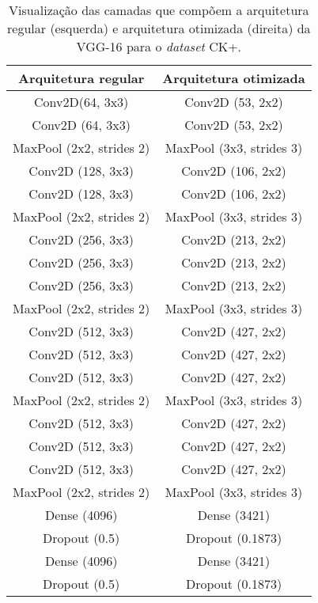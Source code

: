 \documentclass[
12pt,       %
openright,      %
oneside,      %
a4paper,      %
english,      %
french,       %
spanish,      %
brazil        %
]{abntex2}
\begin{document}
\begin{table}[H]
\centering
\caption{Visualização das camadas que compõem a arquitetura regular (esquerda) e arquitetura otimizada (direita) da VGG-16 para o \textit{dataset} CK+.}
\label{tab:comparacao-vgg16-ck+}
\begin{tabular}{@{}cc@{}}
\toprule
\textbf{Arquitetura regular} & \textbf{Arquitetura otimizada} \\ \midrule
Conv2D(64, 3x3)              & Conv2D (53, 2x2)                \\
Conv2D (64, 3x3)              & Conv2D (53, 2x2)                \\
MaxPool (2x2, strides 2)     & MaxPool (3x3, strides 3)       \\
Conv2D (128, 3x3)             & Conv2D (106, 2x2)               \\
Conv2D (128, 3x3)             & Conv2D (106, 2x2)               \\
MaxPool (2x2, strides 2)     & MaxPool (3x3, strides 3)       \\
Conv2D (256, 3x3)             & Conv2D (213, 2x2)               \\
Conv2D (256, 3x3)             & Conv2D (213, 2x2)               \\
Conv2D (256, 3x3)             & Conv2D (213, 2x2)               \\
MaxPool (2x2, strides 2)     & MaxPool (3x3, strides 3)       \\
Conv2D (512, 3x3)             & Conv2D (427, 2x2)               \\
Conv2D (512, 3x3)             & Conv2D (427, 2x2)               \\
Conv2D (512, 3x3)             & Conv2D (427, 2x2)               \\
MaxPool (2x2, strides 2)     & MaxPool (3x3, strides 3)       \\
Conv2D (512, 3x3)             & Conv2D (427, 2x2)               \\
Conv2D (512, 3x3)             & Conv2D (427, 2x2)               \\
Conv2D (512, 3x3)             & Conv2D (427, 2x2)               \\
MaxPool (2x2, strides 2)     & MaxPool (3x3, strides 3)       \\
Dense (4096)                 & Dense (3421)                   \\
Dropout (0.5)                & Dropout (0.1873)               \\
Dense (4096)                 & Dense (3421)                   \\
Dropout (0.5)                & Dropout (0.1873)               \\ \bottomrule
\end{tabular}
\end{table}
\end{document}
